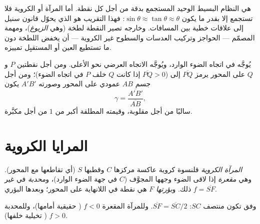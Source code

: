 \begin{remark}\label{rem:b1:mirrors-thin-lenses:why}
 هي النظام البسيط الوحيد المستجمع بدقة من أجل كل نقطة.
أما المرآة أو  الكروية فلا تستجمع إلا بقدر ما يكون
$\sin\theta \approx \tan\theta \approx \theta$: فهذا التقريب هو الذي
يحوّل قانون سنيل إلى علاقات خطية بين المسافات. وخارجه تصير 
النقطة لطخة (وهي \emph{الزيوغ})، ومهمة المصمّم --- الحواجز وتركيب
العدسات والسطوح غير الكروية --- أن يخفض اللطخة دون ما تستطيع العين أو
المستقبِل تمييزه.
\end{remark}

\begin{notation}\label{not:b1:mirrors-thin-lenses:signs}
يُوجَّه  في اتجاه الضوء الوارد، ويُوجَّه الاتجاه العرضي
نحو الأعلى. ومن أجل نقطتين $P$ و $Q$ على المحور يرمز
$\overline{PQ}$ إلى  ($\overline{PQ} > 0$
إذا كانت $Q$ خلف $P$ في اتجاه الضوء)؛ ومن أجل جسم $AB$ عمودي على
المحور وصورته $A'B'$ يكون \emph{}
\[
\gamma = \frac{\overline{A'B'}}{\overline{AB}} ,
\]
سالبًا من أجل  مقلوبة، وقيمته المطلقة أكبر من $1$ من أجل 
مكبَّرة.
\end{notation}

\section{المرايا الكروية}

\begin{definition}\label{def:b1:mirrors-thin-lenses:mirror}
\emph{المرآة الكروية} قلنسوة كروية عاكسة مركزها $C$
وقطبها $S$ (أي تقاطعها مع المحور). وهي \emph{مقعرة}
إذا لاقى الضوء وجهها المجوَّف ($C$ في جهة الضوء
الوارد)، و\emph{محدبة} في غير ذلك. و\emph{بؤرتها} $F$ هي  نقطة في
اللانهاية على المحور؛ وبعدها البؤري $f = \overline{SF}$.
\end{definition}

\begin{proposition}\label{prop:b1:mirrors-thin-lenses:focus}
وفق  تكون  منتصف $SC$:
$\overline{SF} = \overline{SC}/2$. وللمرآة المقعرة $f < 0$ (
حقيقية أمامها)، وللمحدبة $f > 0$ ( تخيلية خلفها).
\end{proposition}

